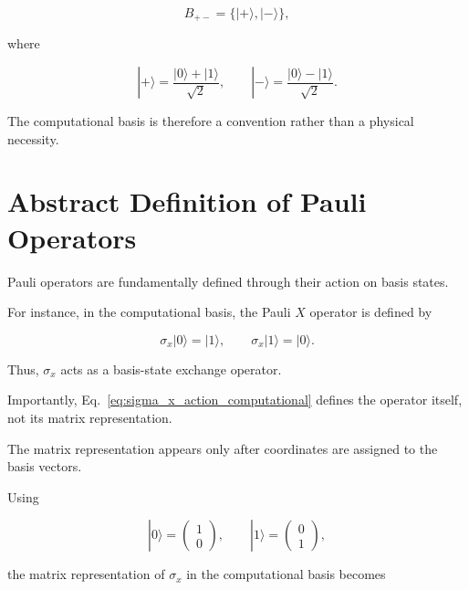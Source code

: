 \begin{equation}
B_{+-}
=
\{
|+\rangle,
|-\rangle
\},
\label{eq:plus_minus_basis_appendix}
\end{equation}

where

\begin{equation}
|+\rangle
=
\frac{|0\rangle+|1\rangle}{\sqrt{2}},
\qquad
|-\rangle
=
\frac{|0\rangle-|1\rangle}{\sqrt{2}}.
\label{eq:plus_minus_states_appendix}
\end{equation}

The computational basis is therefore a convention rather than a physical necessity.


\section*{Abstract Definition of Pauli Operators}

Pauli operators are fundamentally defined through their action on basis states.

For instance, in the computational basis, the Pauli \(X\) operator is defined by

\begin{equation}
\sigma_x |0\rangle = |1\rangle,
\qquad
\sigma_x |1\rangle = |0\rangle.
\label{eq:sigma_x_action_computational}
\end{equation}

Thus, \( \sigma_x \) acts as a basis-state exchange operator.

\medskip

Importantly, Eq.~\eqref{eq:sigma_x_action_computational} defines the operator itself, not its matrix representation.

The matrix representation appears only after coordinates are assigned to the basis vectors.

Using

\[
|0\rangle
=
\begin{pmatrix}
1\\
0
\end{pmatrix},
\qquad
|1\rangle
=
\begin{pmatrix}
0\\
1
\end{pmatrix},
\]

the matrix representation of \( \sigma_x \) in the computational basis becomes

